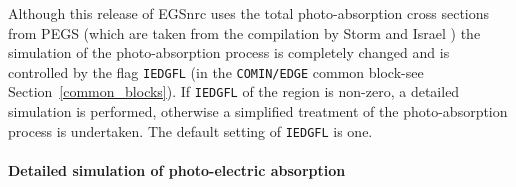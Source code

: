 Although this release of EGSnrc uses the total photo-absorption 
cross sections from PEGS (which are taken from the 
compilation by Storm and Israel \cite{SI70}) 
the simulation of the photo-absorption process 
is completely changed and is controlled 
by the flag {\tt IEDGFL}
(in the {\tt COMIN/EDGE} common block-see Section~\ref{common_blocks}). If {\tt IEDGFL} of the 
region is non-zero, a detailed simulation is performed, 
otherwise a simplified treatment of the photo-absorption process 
is undertaken. The default setting of {\tt IEDGFL} is one. 

\paragraph{Detailed simulation of photo-electric absorption}\hfill
\label{photo_detailed}

